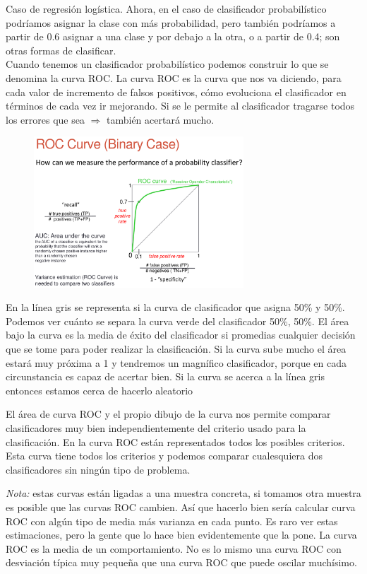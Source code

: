 \documentclass[11pt,a4paper]{article}
\theoremstyle{definition}
\begin{document}
	Caso de regresión logística. Ahora, en el caso de clasificador probabilístico podríamos asignar la clase con más probabilidad, pero también podríamos a partir de 0.6 asignar a una clase y por debajo a la otra, o a partir de 0.4; son otras formas de clasificar.\\
	Cuando tenemos un clasificador probabilístico podemos construir lo que se denomina la curva ROC. La curva ROC es la curva que nos va diciendo, para cada valor de incremento de falsos positivos, cómo evoluciona el clasificador en términos de cada vez ir mejorando. Si se le permite al clasificador tragarse todos los errores que sea $\Rightarrow$ también acertará mucho.
	
	\begin{figure}[H]
		\centering
		\includegraphics[width=0.7\textwidth]{images/roc_curve}
	\end{figure}
	En la línea gris se representa si la curva de clasificador que asigna 50\% y 50\%. Podemos ver cuánto se separa la curva verde del clasificador 50\%, 50\%. El área bajo la curva es la media de éxito del clasificador si promedias cualquier decisión que se tome para poder realizar la clasificación. Si la curva sube mucho el área estará muy próxima a 1 y tendremos un magnífico clasificador, porque en cada circunstancia es capaz de acertar bien. Si la curva se acerca a la línea gris entonces estamos cerca de hacerlo aleatorio
	
	El área de curva ROC y el propio dibujo de la curva nos permite comparar clasificadores muy bien independientemente del criterio usado para la clasificación. En la curva ROC están representados todos los posibles criterios. Esta curva tiene todos los criterios y podemos comparar cualesquiera dos clasificadores sin ningún tipo de problema.
	
	\textit{Nota:} estas curvas están ligadas a una muestra concreta, si tomamos otra muestra es posible que las curvas ROC cambien. Así que hacerlo bien sería calcular curva ROC con algún tipo de media más varianza en cada punto. Es raro ver estas estimaciones, pero la gente que lo hace bien evidentemente que la pone. La curva ROC es la media de un comportamiento. No es lo mismo una curva ROC con desviación típica muy pequeña que una curva ROC que puede oscilar muchísimo.
	
\end{document}
